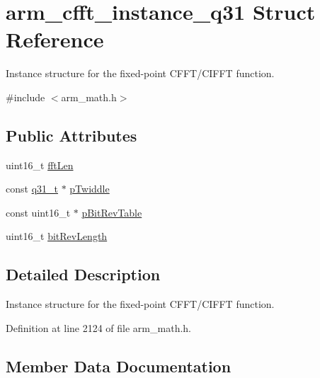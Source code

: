 \hypertarget{structarm__cfft__instance__q31}{}\section{arm\+\_\+cfft\+\_\+instance\+\_\+q31 Struct Reference}
\label{structarm__cfft__instance__q31}


Instance structure for the fixed-\/point C\+F\+F\+T/\+C\+I\+F\+FT function.  




{\ttfamily \#include $<$arm\+\_\+math.\+h$>$}

\subsection*{Public Attributes}
\begin{DoxyCompactItemize}
\item 
uint16\+\_\+t \hyperlink{structarm__cfft__instance__q31_a4406f23e8fd0bff8d555225612e2a2a8}{fft\+Len}
\item 
const \hyperlink{arm__math_8h_adc89a3547f5324b7b3b95adec3806bc0}{q31\+\_\+t} $\ast$ \hyperlink{structarm__cfft__instance__q31_af751114feb91de3ace8600e91bdd0872}{p\+Twiddle}
\item 
const uint16\+\_\+t $\ast$ \hyperlink{structarm__cfft__instance__q31_a8a464461649f023325ced1e10470f5d0}{p\+Bit\+Rev\+Table}
\item 
uint16\+\_\+t \hyperlink{structarm__cfft__instance__q31_a2250fa6b8fe73292c5418c50c0549f87}{bit\+Rev\+Length}
\end{DoxyCompactItemize}


\subsection{Detailed Description}
Instance structure for the fixed-\/point C\+F\+F\+T/\+C\+I\+F\+FT function. 

Definition at line 2124 of file arm\+\_\+math.\+h.



\subsection{Member Data Documentation}
\mbox{\label{structarm__cfft__instance__q31_a2250fa6b8fe73292c5418c50c0549f87}} 
